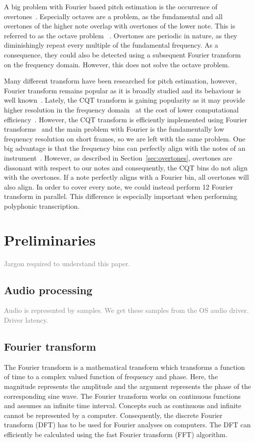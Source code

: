 \documentclass[10pt,twocolumn]{article}
\begin{document}
A big problem with Fourier based pitch estimation is the occurrence of overtones~\cite{oud}. Especially octaves are a problem, as the fundamental and all overtones of the higher note overlap with overtones of the lower note. This is referred to as the octave problem~
\cite{octave}. Overtones are periodic in nature, as they diminishingly repeat every multiple of the fundamental frequency. As a consequence, they could also be detected using a subsequent Fourier transform~\cite{doublefourier} on the frequency domain. However, this does not solve the octave problem.

Many different transform have been researched for pitch estimation, however, Fourier transform remains popular as it is broadly studied and its behaviour is well known~\cite{survey}. Lately, the CQT transform is gaining popularity as it may provide higher resolution in the frequency domain~\cite{cqtres} at the cost of lower computational efficiency~\cite{cqtslow}. However, the CQT transform is efficiently implemented using Fourier transforms~\cite{cqtfft} and the main problem with Fourier is the fundamentally low frequency resolution on short frames, so we are left with the same problem. One big advantage is that the frequency bins can perfectly align with the notes of an instrument~\cite{cqtalign}. However, as described in Section~\ref{sec:overtones}, overtones are dissonant with respect to our notes and consequently, the CQT bins do not align with the overtones. If a note perfectly aligns with a Fourier bin, all overtones will also align. In order to cover every note, we could instead perform 12 Fourier transform in parallel. This difference is especially important when performing polyphonic transcription.


\section{Preliminaries}
\textcolor{gray}{Jargon required to understand this paper.}

\subsection{Audio processing}
\textcolor{gray}{Audio is represented by samples. We get these samples from the OS audio driver. Driver latency.}

\subsection{Fourier transform}
The Fourier transform is a mathematical transform which transforms a function of time to a complex valued function of frequency and phase. Here, the magnitude represents the amplitude and the argument represents the phase of the corresponding sine wave. The Fourier transform works on continuous functions and assumes an infinite time interval. Concepts such as continuous and infinite cannot be represented by a computer. Consequently, the discrete Fourier transform (DFT) has to be used for Fourier analyses on computers. The DFT can efficiently be calculated using the fast Fourier transform (FFT) algorithm.
\end{document}
